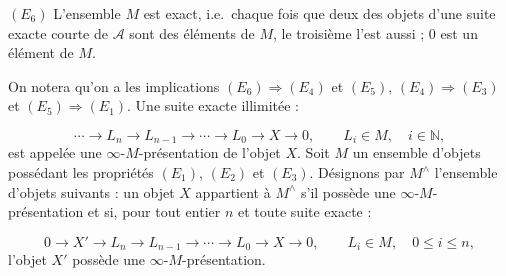 \noindent$(E_6)$ L'ensemble $M$ est exact, i.e.\ chaque fois que deux des
objets d'une suite exacte courte de $\mathcal A$ sont des éléments de $M$,
le troisième l'est aussi ; $0$ est un élément de $M$.

On notera qu'on a les implications $(E_6)\Rightarrow(E_4)$ et $(E_5)$,
$(E_4)\Rightarrow(E_3)$ et $(E_5)\Rightarrow(E_1)$. Une suite exacte
illimitée :

\[
\cdots\longrightarrow L_n\longrightarrow L_{n-1}
\longrightarrow\cdots\longrightarrow L_0\longrightarrow X
\longrightarrow0,
\qquad L_i\in M,\quad i\in\mathbb N,
\]
est appelée une $\infty$-$M$-présentation de l'objet $X$. Soit $M$ un
ensemble d'objets possédant les propriétés $(E_1)$, $(E_2)$ et $(E_3)$.
Désignons par $M^{\wedge}$ l'ensemble d'objets suivants : un objet $X$
appartient à $M^{\wedge}$ s'il possède une $\infty$-$M$-présentation et si,
pour tout entier $n$ et toute suite exacte :

\[
0\longrightarrow X'\longrightarrow L_n\longrightarrow L_{n-1}
\longrightarrow\cdots\longrightarrow L_0\longrightarrow X
\longrightarrow0,
\qquad L_i\in M,\quad0\leq i\leq n,
\]
l'objet $X'$ possède une $\infty$-$M$-présentation.
\endgroup
